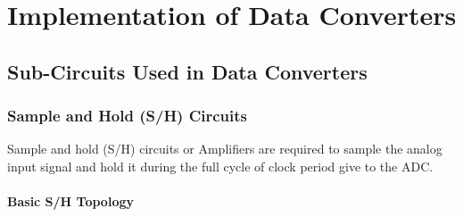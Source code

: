 \chapter{Implementation of Data Converters}
\addborderb
\label{chapter:results}
\section{Sub-Circuits Used in Data Converters}

\subsection{Sample and Hold (S/H) Circuits}
Sample and hold (S/H) circuits or Amplifiers are required to sample the analog input signal and hold it during the full cycle of clock period give to the ADC.
\subsubsection{Basic S/H Topology}
